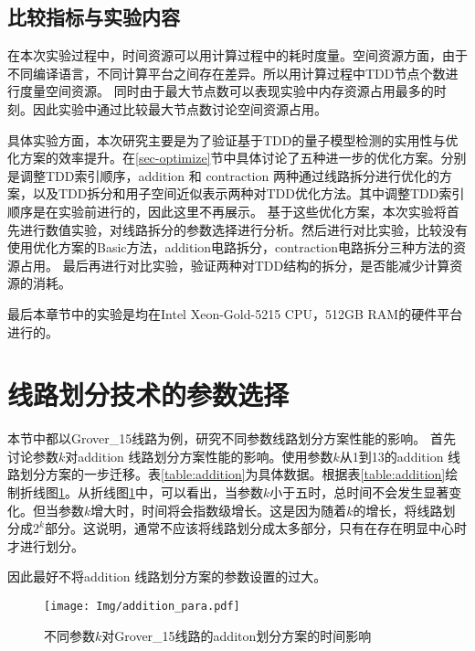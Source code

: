 \subsection*{比较指标与实验内容}
在本次实验过程中，时间资源可以用计算过程中的耗时度量。空间资源方面，由于不同编译语言，不同计算平台之间存在差异。所以用计算过程中TDD节点个数进行度量空间资源。
同时由于最大节点数可以表现实验中内存资源占用最多的时刻。因此实验中通过比较最大节点数讨论空间资源占用。

具体实验方面，本次研究主要是为了验证基于TDD的量子模型检测的实用性与优化方案的效率提升。在\ref{sec-optimize}节中具体讨论了五种进一步的优化方案。分别是调整TDD索引顺序，addition 和 contraction 两种通过线路拆分进行优化的方案，以及TDD拆分和用子空间近似表示两种对TDD优化方法。其中调整TDD索引顺序是在实验前进行的，因此这里不再展示。
基于这些优化方案，本次实验将首先进行数值实验，对线路拆分的参数选择进行分析。然后进行对比实验，比较没有使用优化方案的Basic方法，addition电路拆分，contraction电路拆分三种方法的资源占用。
最后再进行对比实验，验证两种对TDD结构的拆分，是否能减少计算资源的消耗。

最后本章节中的实验是均在Intel Xeon-Gold-5215 CPU，512GB RAM的硬件平台进行的。
\section{线路划分技术的参数选择}
\label{sec-para}
本节中都以Grover\_15线路为例，研究不同参数线路划分方案性能的影响。
首先讨论参数$k$对addition 线路划分方案性能的影响。使用参数$k$从1到13的addition 线路划分方案的一步迁移。表\ref{table:addition}为具体数据。根据表\ref{table:addition}绘制折线图\ref{fig:addition-ex}。从折线图\ref{fig:addition-ex}中，可以看出，当参数$k$小于五时，总时间不会发生显著变化。但当参数$k$增大时，时间将会指数级增长。这是因为随着$k$的增长，将线路划分成$2^k$部分。这说明，通常不应该将线路划分成太多部分，只有在存在明显中心时才进行划分。

因此最好不将addition 线路划分方案的参数设置的过大。
\begin{figure}
    \centering
    \texttt{[image: Img/addition\_para.pdf]}
    \caption{不同参数$k$对Grover\_15线路的additon划分方案的时间影响}
    \label{fig:addition-ex}
\end{figure}
\begin{table}[htbp]
    \caption{对grover\_15应用不同的addition参数的时间对比}
    \label{table:addition}
    \centering
\end{table}


